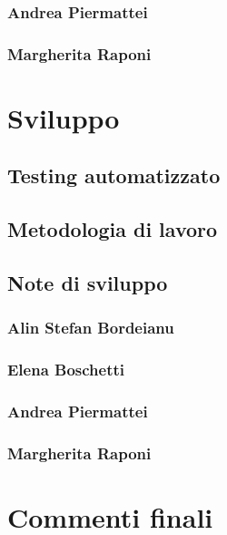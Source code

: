 \documentclass[a4paper,12pt]{report}
\begin{document}
\subsection{Andrea Piermattei}

\subsection{Margherita Raponi}



\chapter{Sviluppo}


\section{Testing automatizzato}


\section{Metodologia di lavoro}


\section{Note di sviluppo}

\subsection{Alin Stefan Bordeianu}

\subsection{Elena Boschetti}

\subsection{Andrea Piermattei}

\subsection{Margherita Raponi}



\chapter{Commenti finali}
\end{document}
